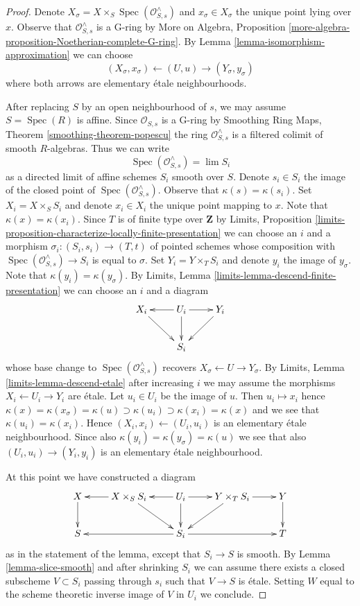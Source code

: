 \documentclass[10pt,a4paper]{amsart}
\theoremstyle{plain}
\theoremstyle{definition}
\theoremstyle{remark}
\numberwithin{equation}{subsection}
\def\lim{\mathop{\mathrm{lim}}\nolimits}
\def\Spec{\mathop{\mathrm{Spec}}}
\begin{document}
\begin{proof}
Denote $X_\sigma = X \times_S \Spec(\mathcal{O}_{S, s}^\wedge)$
and $x_\sigma \in X_\sigma$ the unique point lying over $x$.
Observe that $\mathcal{O}_{S, s}^\wedge$ is a G-ring by
More on Algebra, Proposition
\ref{more-algebra-proposition-Noetherian-complete-G-ring}.
By Lemma \ref{lemma-isomorphism-approximation}
we can choose
$$
(X_\sigma, x_\sigma) \leftarrow (U, u) \rightarrow (Y_\sigma, y_\sigma)
$$
where both arrows are elementary \'etale neighbourhoods.

\medskip\noindent
After replacing $S$ by an open neighbourhood of $s$, we may
assume $S = \Spec(R)$ is affine. Since $\mathcal{O}_{S, s}$
is a G-ring by Smoothing Ring Maps, Theorem \ref{smoothing-theorem-popescu}
the ring $\mathcal{O}_{S, s}^\wedge$ is a filtered colimit of smooth
$R$-algebras. Thus we can write
$$
\Spec(\mathcal{O}_{S, s}^\wedge) = \lim S_i
$$
as a directed limit of affine schemes $S_i$ smooth over $S$.
Denote $s_i \in S_i$ the image of the closed point of
$\Spec(\mathcal{O}_{S, s}^\wedge)$. Observe that $\kappa(s) = \kappa(s_i)$.
Set $X_i = X \times_S S_i$ and denote $x_i \in X_i$ the unique
point mapping to $x$. Note that $\kappa(x) = \kappa(x_i)$.
Since $T$ is of finite type over $\mathbf{Z}$ by Limits, Proposition
\ref{limits-proposition-characterize-locally-finite-presentation}
we can choose an $i$ and a morphism $\sigma_i : (S_i, s_i) \to (T, t)$
of pointed schemes whose composition with
$\Spec(\mathcal{O}_{S, s}^\wedge) \to S_i$ is equal to $\sigma$.
Set $Y_i = Y \times_T S_i$ and denote $y_i$ the
image of $y_\sigma$. Note that $\kappa(y_i) = \kappa(y_\sigma)$.
By Limits, Lemma \ref{limits-lemma-descend-finite-presentation}
we can choose an $i$ and a diagram
$$
\xymatrix{
X_i \ar[rd] &
U_i \ar[l] \ar[d] \ar[r] &
Y_i \ar[ld] \\
& S_i
}
$$
whose base change to $\Spec(\mathcal{O}_{S, s}^\wedge)$
recovers $X_\sigma \leftarrow U \rightarrow Y_\sigma$.
By Limits, Lemma \ref{limits-lemma-descend-etale}
after increasing $i$ we may assume the morphisms
$X_i \leftarrow U_i \rightarrow Y_i$ are \'etale.
Let $u_i \in U_i$ be the image of $u$. Then $u_i \mapsto x_i$
hence
$\kappa(x) = \kappa(x_\sigma) = \kappa(u) \supset \kappa(u_i) \supset
\kappa(x_i) = \kappa(x)$ and we see that $\kappa(u_i) = \kappa(x_i)$.
Hence $(X_i, x_i) \leftarrow (U_i, u_i)$ is an elementary
\'etale neighbourhood. Since also $\kappa(y_i) = \kappa(y_\sigma) = \kappa(u)$
we see that also $(U_i, u_i) \to (Y_i, y_i)$ is an elementary
\'etale neighbourhood.

\medskip\noindent
At this point we have constructed a diagram
$$
\xymatrix{
X \ar[d] &
X \times_S S_i \ar[l] \ar[rd] &
U_i \ar[l] \ar[r] \ar[d] &
Y \times_T S_i \ar[r] \ar[ld] &
Y \ar[d] \\
S & &
S_i \ar[ll] \ar[rr] & &
T
}
$$
as in the statement of the lemma, except that $S_i \to S$ is smooth.
By Lemma \ref{lemma-slice-smooth} and after shrinking $S_i$
we can assume there exists a closed subscheme $V \subset S_i$ passing
through $s_i$ such that $V \to S$ is \'etale.
Setting $W$ equal to the scheme theoretic inverse image of $V$
in $U_i$ we conclude.
\end{proof}
\end{document}
